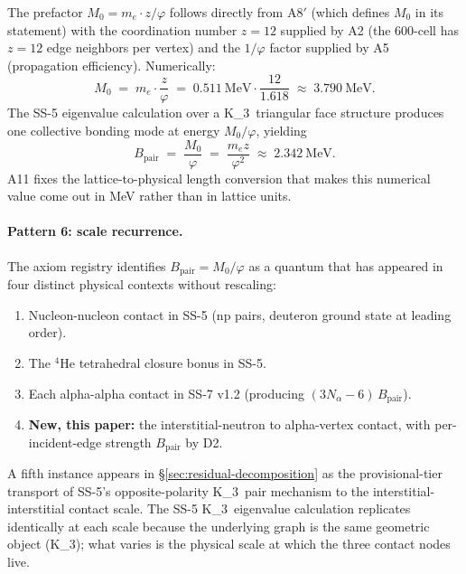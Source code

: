 \documentclass[11pt,letterpaper]{article}
\theoremstyle{definition}
\newcommand{\Mzero}{M_0}
\newcommand{\phig}{\varphi}
\newcommand{\Bpair}{B_{\text{pair}}}
\newcommand{\Nalpha}{N_\alpha}
\newcommand{\Kthree}{K_3}
\begin{document}
The prefactor $\Mzero = m_e \cdot z/\phig$ follows directly from A8$'$ (which defines $\Mzero$ in its statement) with the coordination number $z = 12$ supplied by A2 (the 600-cell has $z = 12$ edge neighbors per vertex) and the $1/\phig$ factor supplied by A5 (propagation efficiency). Numerically:
\begin{equation}
  \Mzero \;=\; m_e \cdot \frac{z}{\phig} \;=\; 0.511~\mathrm{MeV} \cdot \frac{12}{1.618} \;\approx\; 3.790~\mathrm{MeV}.
  \label{eq:M0}
\end{equation}
The SS-5 eigenvalue calculation over a \Kthree\ triangular face structure produces one collective bonding mode at energy $\Mzero/\phig$, yielding
\begin{equation}
  \Bpair \;=\; \frac{\Mzero}{\phig} \;=\; \frac{m_e z}{\phig^2} \;\approx\; 2.342~\mathrm{MeV}.
  \label{eq:Bpair}
\end{equation}
A11 fixes the lattice-to-physical length conversion that makes this numerical value come out in MeV rather than in lattice units.

\paragraph{Pattern 6: scale recurrence.}

The axiom registry identifies $\Bpair = \Mzero/\phig$ as a quantum that has appeared in four distinct physical contexts without rescaling:

\begin{enumerate}
  \item Nucleon-nucleon contact in SS-5 (np pairs, deuteron ground state at leading order).
  \item The ${}^{4}\mathrm{He}$ tetrahedral closure bonus in SS-5.
  \item Each alpha-alpha contact in SS-7 v1.2 (producing $(3\Nalpha - 6)\,\Bpair$).
  \item \textbf{New, this paper:} the interstitial-neutron to alpha-vertex contact, with per-incident-edge strength $\Bpair$ by D2.
\end{enumerate}

A fifth instance appears in \S\ref{sec:residual-decomposition} as the provisional-tier transport of SS-5's opposite-polarity \Kthree\ pair mechanism to the interstitial-interstitial contact scale. The SS-5 \Kthree\ eigenvalue calculation replicates identically at each scale because the underlying graph is the same geometric object (\Kthree); what varies is the physical scale at which the three contact nodes live.
\end{document}
